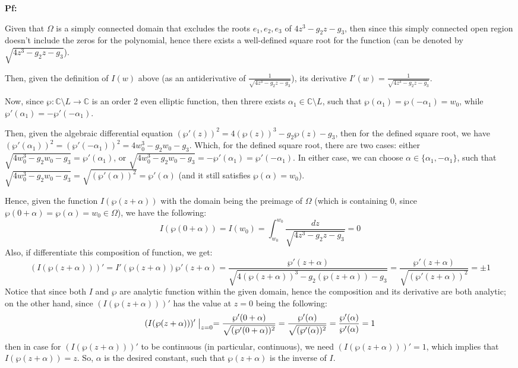 \documentclass{article}
\begin{document}
\textbf{Pf:}

Given that $\Omega$ is a simply connected domain that excludes the roots $e_1,e_2,e_3$ of $4z^3-g_2z-g_3$,
then since this simply connected open region doesn't include the zeros for the polynomial, hence there exists a well-defined square root for the function
(can be denoted by $\sqrt{4z^3-g_2z-g_3}$).

Then, given the definition of $I(w)$ above (as an antiderivative of $\frac{1}{\sqrt{4z^3-g_2z-g_3}}$), its derivative $I'(w)=\frac{1}{\sqrt{4z^3-g_2z-g_3}}$.

\hfil

Now, since $\wp:\mathbb{C}\setminus L\rightarrow\mathbb{C}$ is an order 2 even elliptic function, then threre exists $\alpha_1\in \mathbb{C}\setminus L$, such that $\wp(\alpha_1)=\wp(-\alpha_1)=w_0$,
while $\wp'(\alpha_1) = -\wp'(-\alpha_1)$.

Then, given the algebraic differential equation $(\wp'(z))^2=4(\wp(z))^3-g_2\wp(z)-g_3$, then for the defined square root, we have $(\wp'(\alpha_1))^2=(\wp'(-\alpha_1))^2 = 4w_0^3-g_2w_0-g_3$. 
Which, for the defined square root, there are two cases: either $\sqrt{4w_0^3-g_2w_0-g_3} = \wp'(\alpha_1)$, or $\sqrt{4w_0^3-g_2w_0-g_3} = -\wp'(\alpha_1) = \wp'(-\alpha_1)$.
In either case, we can choose $\alpha\in \{\alpha_1,-\alpha_1\}$, such that $\sqrt{4w_0^3-g_2w_0-g_3} = \sqrt{(\wp'(\alpha))^2} = \wp'(\alpha)$ (and it still satisfies $\wp(\alpha)=w_0$).

Hence, given the function $I(\wp(z+\alpha))$ with the domain being the preimage of $\Omega$ (which is containing $0$, since $\wp(0+\alpha)=\wp(\alpha)=w_0\in\Omega$), we have the following:
$$I(\wp(0+\alpha)) = I(w_0)=\int_{w_0}^{w_0}\frac{dz}{\sqrt{4z^3-g_2z-g_3}} = 0$$
Also, if differentiate this composition of function, we get:
$$(I(\wp(z+\alpha)))' = I'(\wp(z+\alpha))\wp'(z+\alpha) = \frac{\wp'(z+\alpha)}{\sqrt{4(\wp(z+\alpha))^3-g_2(\wp(z+\alpha))-g_3}} = \frac{\wp'(z+\alpha)}{\sqrt{(\wp'(z+\alpha))^2}} = \pm 1$$
Notice that since both $I$ and $\wp$ are analytic function within the given domain, hence the composition and its derivative are both analytic;
on the other hand, since $(I(\wp(z+\alpha)))'$ has the value at $z=0$ being the following:
$$(I(\wp(z+\alpha)))'\bigm|_{z=0} = \frac{\wp'(0+\alpha)}{\sqrt{(\wp'(0+\alpha))^2}} = \frac{\wp'(\alpha)}{\sqrt{(\wp'(\alpha))^2}} = \frac{\wp'(\alpha)}{\wp'(\alpha)}=1$$
then in case for $(I(\wp(z+\alpha)))'$ to be continuous (in particular, continuous), we need $(I(\wp(z+\alpha)))' = 1$, which implies that $I(\wp(z+\alpha))=z$.
So, $\alpha$ is the desired constant, such that $\wp(z+\alpha)$ is the inverse of $I$.
\end{document}
